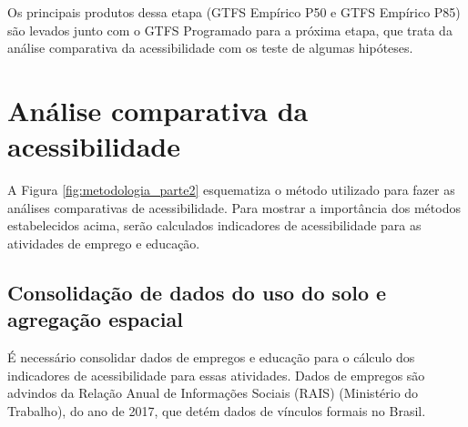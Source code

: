\documentclass[        
    a4paper,          %
    12pt,             %
    chapter=TITLE,    %
    section=Title,    %
    subsection=Title, %
    oneside,          %
    english,          %
    spanish,          %
    brazil,           %
    fleqn             %
]{abntex2}
\begin{document}
  Os principais produtos dessa etapa (GTFS Empírico P50 e GTFS Empírico P85) são levados junto com o GTFS Programado para a próxima etapa, que trata da análise comparativa da acessibilidade com os teste de algumas hipóteses.
  
  \hypertarget{analise-comparativa-da-acessibilidade}{%
  \section{Análise comparativa da acessibilidade}\label{analise-comparativa-da-acessibilidade}}
  
  A Figura \ref{fig:metodologia_parte2} esquematiza o método utilizado para fazer as análises comparativas de acessibilidade. Para mostrar a importância dos métodos estabelecidos acima, serão calculados indicadores de acessibilidade para as atividades de emprego e educação.
  
  \begin{figure}[!h]
  \captionsetup{width=16cm}
  \centering
  \end{figure}
  
  \hypertarget{consolidacao-de-dados-do-uso-do-solo-e-agregacao-espacial}{%
  \subsection{Consolidação de dados do uso do solo e agregação espacial}\label{consolidacao-de-dados-do-uso-do-solo-e-agregacao-espacial}}
  
  É necessário consolidar dados de empregos e educação para o cálculo dos indicadores de acessibilidade para essas atividades. Dados de empregos são advindos da Relação Anual de Informações Sociais (RAIS) (Ministério do Trabalho), do ano de 2017, que detém dados de vínculos formais no Brasil.
  
\end{document}
